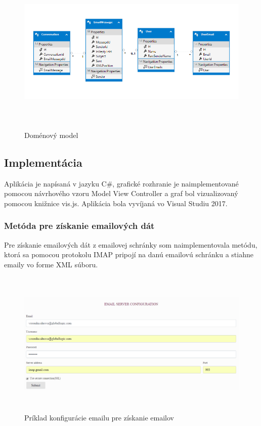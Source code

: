 \documentclass[slovak,master,public,dept460,male,cpdeclaration,oneside]{diploma}
\begin{document}
\begin{figure}[H]
\centering
\includegraphics[width=16cm, height=8cm]{figures/domain_model}
\caption{Doménový model}
\end{figure}




\subsection{Implementácia}
Aplikácia je napísaná v jazyku C\#, grafické rozhranie je naimplementované pomocou návrhového vzoru Model View Controller a graf bol vizualizovaný pomocou knižnice vis.js. Aplikácia bola vyvíjaná vo Visual Studiu 2017.

\subsubsection{Metóda pre získanie emailových dát}
Pre získanie emailových dát z emailovej schránky som naimplementovala metódu, ktorá sa pomocou protokolu IMAP pripojí na danú emailovú schránku a stiahne emaily vo forme XML súboru. 

\begin{figure}[H]
\centering
\includegraphics[width=15cm, height=7cm]{figures/konfiguracia_emailu}
\caption{Príklad konfigurácie emailu pre získanie emailov}
\end{figure}
\end{document}
